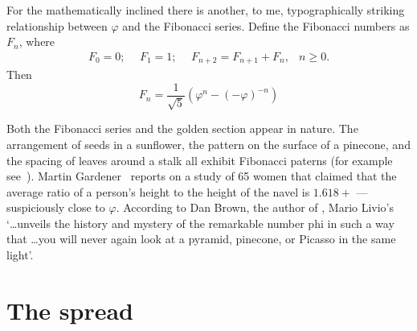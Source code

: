 \documentclass[10pt,a4paper,extrafontsizes]{memoir}
\begin{document}
\begin{paracol}{2}
    For the mathematically inclined there is another, to me, typographically
striking
relationship between $\varphi$ and the Fibonacci series. Define the
Fibonacci numbers as $F_{n}$, where
\begin{equation}
\begin{array}{cccc}
F_{0} = 0;\ \ & F_{1}=1;\ \ & F_{n+2}=F_{n+1} + F_{n},  &  n \geq 0.
\end{array}
\end{equation}
Then
\begin{equation}
 F_{n} = \frac{1}{\sqrt{5}}(\varphi^{n} - (- \varphi)^{-n})
\end{equation}

    Both the Fibonacci series and the golden section appear in nature.
The arrangement of seeds in a sunflower, the pattern on the surface of a 
pinecone, and the spacing of leaves around a stalk all exhibit Fibonacci
paterns (for example see~\autocite{CONWAY96}). Martin Gardener~\autocite{GARDNER66}
reports on a study of 65 women that claimed that the average ratio of a 
person's height to the height of the navel is $1.618+$ --- suspiciously 
close to $\varphi$. According to Dan Brown, the author of 
, Mario Livio's 
~\autocite{LIVIO02} 
`\ldots unveils the history and mystery of the remarkable
number phi in such a way that \ldots you will never again look at a pyramid,
pinecone, or Picasso in the same light'.
\end{paracol}



\section{The spread} \label{sec:spread}
\end{document}
